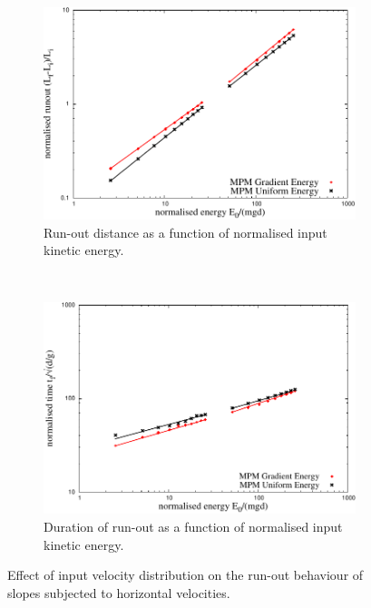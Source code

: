\begin{figure}[tbph]
\centering
\begin{subfigure}[b]{0.95\textwidth}
\centering
\includegraphics[width=\textwidth]{Runout_Eo_GU}
\caption{Run-out distance as a function of normalised input kinetic energy.}
\label{fig:Runout_Eo_GU}
\end{subfigure}
\\
\begin{subfigure}[b]{0.95\textwidth}
\centering
\includegraphics[width=\textwidth]{time_Eo_GU}
\caption{Duration of run-out as a function of normalised input kinetic energy.}
\label{fig:time_Eo_GU}
\end{subfigure}
\caption{Effect of input velocity distribution on the run-out behaviour of 
slopes subjected to horizontal velocities.}
\label{fig:GU}
\end{figure}

